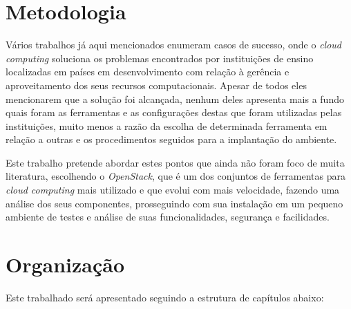 \section{Metodologia}

Vários trabalhos já aqui mencionados enumeram casos de sucesso, onde o \emph{cloud computing} soluciona os problemas
encontrados por instituições de ensino localizadas em países em desenvolvimento com relação à gerência e aproveitamento
dos seus recursos computacionais. Apesar de todos eles mencionarem que a solução foi alcançada, nenhum deles apresenta
mais a fundo quais foram as ferramentas e as configurações destas que foram utilizadas pelas instituições, muito menos
a razão da escolha de determinada ferramenta em relação a outras e os procedimentos seguidos para a implantação do ambiente.

Este trabalho pretende abordar estes pontos que ainda não foram foco de muita literatura, escolhendo o
\emph{OpenStack}, que é um dos conjuntos de ferramentas para \emph{cloud computing} mais utilizado e
que evolui com mais velocidade, fazendo uma análise dos seus componentes, prosseguindo com sua
instalação em um pequeno ambiente de testes e análise de suas funcionalidades, segurança e facilidades.

\section{Organização}
\label{sec:organizacao}

Este trabalhado será apresentado seguindo a estrutura de capítulos abaixo:

